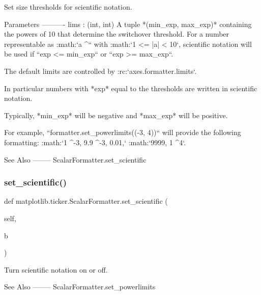 \begin{DoxyVerb}Set size thresholds for scientific notation.

Parameters
----------
lims : (int, int)
    A tuple *(min_exp, max_exp)* containing the powers of 10 that
    determine the switchover threshold. For a number representable as
    :math:`a ^`` with :math:`1 <= |a| < 10`,
    scientific notation will be used if ``exp <= min_exp`` or
    ``exp >= max_exp``.

    The default limits are controlled by :rc:`axes.formatter.limits`.

    In particular numbers with *exp* equal to the thresholds are
    written in scientific notation.

    Typically, *min_exp* will be negative and *max_exp* will be
    positive.

    For example, ``formatter.set_powerlimits((-3, 4))`` will provide
    the following formatting:
    :math:`1 ^{-3}, 9.9 ^{-3}, 0.01,`
    :math:`9999, 1 ^4`.

See Also
--------
ScalarFormatter.set_scientific
\end{DoxyVerb}
 \mbox{\label{classmatplotlib_1_1ticker_1_1ScalarFormatter_a05a1ec2dd82c238190375dd8d2089baf}} 
\subsubsection{\texorpdfstring{set\+\_\+scientific()}{set\_scientific()}}
{\footnotesize\ttfamily def matplotlib.\+ticker.\+Scalar\+Formatter.\+set\+\_\+scientific (\begin{DoxyParamCaption}\item[{}]{self,  }\item[{}]{b }\end{DoxyParamCaption})}

\begin{DoxyVerb}Turn scientific notation on or off.

See Also
--------
ScalarFormatter.set_powerlimits
\end{DoxyVerb}
 \mbox{\label{classmatplotlib_1_1ticker_1_1ScalarFormatter_a03dd9ef155683dca654facedea82de00}} 
